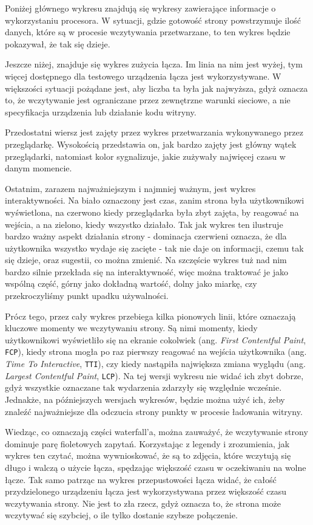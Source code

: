 \documentclass[licencjacka]{pracadypl}
\begin{document}
Poniżej głównego wykresu znajdują się wykresy zawierające informacje o wykorzystaniu procesora. W sytuacji, gdzie gotowość strony powstrzymuje ilość danych, które są w procesie wczytywania przetwarzane, to ten wykres będzie pokazywał, że tak się dzieje.

Jeszcze niżej, znajduje się wykres zużycia łącza. Im linia na nim jest wyżej, tym więcej dostępnego dla testowego urządzenia łącza jest wykorzystywane. W większości sytuacji pożądane jest, aby liczba ta była jak najwyższa, gdyż oznacza to, że wczytywanie jest ograniczane przez zewnętrzne warunki sieciowe, a nie specyfikacja urządzenia lub działanie kodu witryny.

Przedostatni wiersz jest zajęty przez wykres przetwarzania wykonywanego przez przeglądarkę. Wysokością przedstawia on, jak bardzo zajęty jest główny wątek przeglądarki, natomiast kolor sygnalizuje, jakie zużywały najwięcej czasu w danym momencie.

Ostatnim, zarazem najważniejszym i najmniej ważnym, jest wykres interaktywności. Na biało oznaczony jest czas, zanim strona była użytkownikowi wyświetlona, na czerwono kiedy przeglądarka była zbyt zajęta, by reagować na wejścia, a na zielono, kiedy wszystko działało. Tak jak wykres ten ilustruje bardzo ważny aspekt działania strony - dominacja czerwieni oznacza, że dla użytkownika wszystko wydaje się zacięte - tak nie daje on informacji, czemu tak się dzieje, oraz sugestii, co można zmienić. Na szczęście wykres tuż nad nim bardzo silnie przekłada się na interaktywność, więc można traktować je jako wspólną część, górny jako dokładną wartość, dolny jako miarkę, czy przekroczyliśmy punkt upadku używalności. 

Prócz tego, przez cały wykres przebiega kilka pionowych linii, które oznaczają kluczowe momenty we wczytywaniu strony. Są nimi momenty, kiedy użytkownikowi wyświetliło się na ekranie cokolwiek (ang. \emph{First Contentful Paint}, \texttt{FCP}), kiedy strona mogła po raz pierwszy reagować na wejścia użytkownika (ang. \emph{Time To Interactive}, \texttt{TTI}), czy kiedy nastąpiła największa zmiana wyglądu (ang. \emph{Largest Contentful Paint}, \texttt{LCP}). Na tej wersji wykresu nie widać ich zbyt dobrze, gdyż wszystkie oznaczane tak wydarzenia zdarzyły się względnie wcześnie. Jednakże, na późniejszych wersjach wykresów, będzie można użyć ich, żeby znaleźć najważniejsze dla odczucia strony punkty w procesie ładowania witryny.

Wiedząc, co oznaczają części waterfall'a, można zauważyć, że wczytywanie strony dominuje parę fioletowych zapytań. Korzystając z legendy i zrozumienia, jak wykres ten czytać, można wywnioskować, że są to zdjęcia, które wczytują się długo i walczą o użycie łącza, spędzając większość czasu w oczekiwaniu na wolne łącze. Tak samo patrząc na wykres przepustowości łącza widać, że całość przydzielonego urządzeniu łącza jest wykorzystywana przez większość czasu wczytywania strony. Nie jest to zła rzecz, gdyż oznacza to, że strona może wczytywać się szybciej, o ile tylko dostanie szybsze połączenie.
\end{document}
